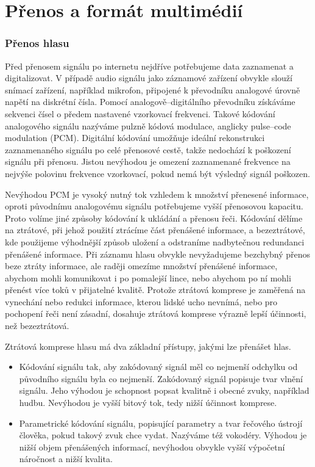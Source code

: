 \chapter{Přenos a formát multimédií}

\subsection{Přenos hlasu}

Před přenosem signálu po internetu nejdříve potřebujeme data zaznamenat a
digitalizovat. V případě audio signálu jako záznamové zařízení obvykle
slouží snímací zařízení, například mikrofon, připojené k převodníku
analogové úrovně napětí na diskrétní čísla. Pomocí analogově--digitálního
převodníku získáváme sekvenci čísel o předem nastavené vzorkovací frekvenci.
Takové kódování analogového signálu nazýváme pulzně kódová modulace, 
anglicky pulse--code modulation (PCM). Digitální kódování umožňuje ideální
rekonstrukci zaznamenaného signálu po celé přenosové cestě, takže nedochází
k poškození signálu při přenosu. Jistou nevýhodou je omezení zaznamenané 
frekvence na nejvýše polovinu frekvence vzorkovací, pokud nemá být výsledný
signál poškozen.

Nevýhodou PCM je vysoký nutný tok vzhledem k množství přenesené informace\cite{digital_speech}, oproti původnímu analogovému signálu potřebujeme vyšší přenosovou kapacitu. Proto volíme jiné způsoby kódování k ukládání a přenosu řeči.
Kódování dělíme na ztrátové, při jehož použití ztrácíme část přenášené 
informace, a bezeztrátové, kde použijeme výhodnější způsob uložení a odstraníme
nadbytečnou redundanci přenášené informace. Při záznamu hlasu obvykle 
nevyžadujeme bezchybný přenos beze ztráty informace, ale raději omezíme 
množství přenášené informace, abychom mohli komunikovat i po pomalejší lince,
nebo abychom po ní mohli přenést více toků v přijatelné kvalitě.
Protože ztrátová komprese je zaměřená na vynechání nebo redukci informace, 
kterou lidské
ucho nevnímá, nebo pro pochopení řeči není zásadní, dosahuje ztrátová komprese
výrazně lepší účinnosti, než bezeztrátová. 

Ztrátová komprese hlasu má dva základní přístupy, jakými lze přenášet hlas.
\begin{itemize}
\item{Kódování signálu tak, aby zakódovaný signál měl co nejmenší
odchylku od původního signálu byla co nejmenší. Zakódovaný signál popisuje
tvar vlnění signálu. Jeho výhodou je schopnost popsat kvalitně i obecné zvuky,
například hudbu. Nevýhodou je vyšší bitový tok, tedy nižší účinnost komprese.}
\item{Parametrické kódování signálu, popisující parametry a tvar řečového 
ústrojí člověka, pokud takový zvuk chce vydat. Nazýváme též vokodéry. 
Výhodou je nižší objem 
přenášených informací, nevýhodou obvykle vyšší výpočetní náročnost a nižší 
kvalita. }
\end{itemize}

